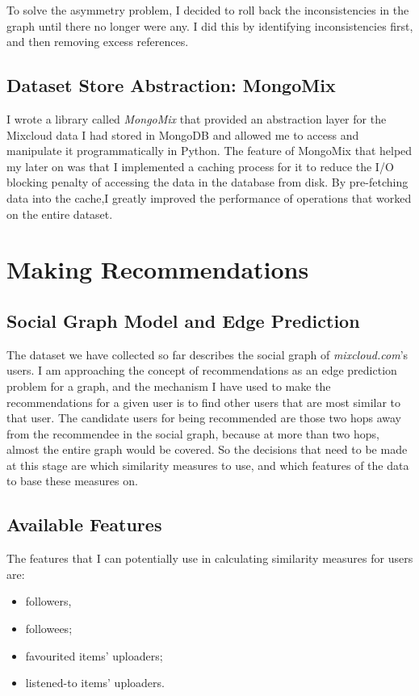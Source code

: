 \documentclass[a4paper,12pt,twoside,notitlepage]{report}
\def\mixurl{\emph{mixcloud.com}}
\begin{document}
To solve the asymmetry problem, I decided to roll back the inconsistencies in
the graph until there no longer were any. I did this by identifying
inconsistencies first, and then removing excess references.

\subsection{Dataset Store Abstraction: MongoMix}

I wrote a library called \emph{MongoMix} that provided an abstraction layer
for the Mixcloud data I had stored in MongoDB and allowed me to access and
manipulate it programmatically in Python. The feature of MongoMix that helped
my later on was that I implemented a caching process for it to reduce the I/O
blocking penalty of accessing the data in the database from disk. By
pre-fetching data into the cache,I greatly improved the performance of
operations that worked on the entire dataset.


\section{Making Recommendations}

\subsection{Social Graph Model and Edge Prediction}

The dataset we have collected so far describes the social graph of \mixurl's
users. I am approaching the concept of recommendations as an edge prediction
problem for a graph, and the mechanism I have used to make the recommendations
for a given user is to find other users that are most similar to that user. The
candidate users for being recommended are those two hops away from the
recommendee in the social graph, because at more than two hops, almost the
entire graph would be covered. So the decisions that need to be made at this
stage are which similarity measures to use, and which features of the data to
base these measures on.

\subsection{Available Features}

The features that I can potentially use in calculating similarity measures for
users are:
\begin{itemize}
 \item followers,
 \item followees;
 \item favourited items' uploaders;
 \item listened-to items' uploaders.
\end{itemize}
\end{document}
